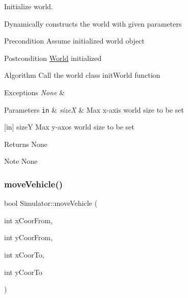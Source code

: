 Initialize world. 

Dynamically constructs the world with given parameters

\begin{DoxyPrecond}{Precondition}
Assume initialized world object
\end{DoxyPrecond}
\begin{DoxyPostcond}{Postcondition}
\hyperlink{class_world}{World} initialized
\end{DoxyPostcond}
\begin{DoxyParagraph}{Algorithm}
Call the world class init\+World function
\end{DoxyParagraph}

\begin{DoxyExceptions}{Exceptions}
{\em None} & \\
\hline
\end{DoxyExceptions}

\begin{DoxyParams}[1]{Parameters}
\mbox{\tt in}  & {\em sizeX} & Max x-\/axis world size to be set\\
\hline
\end{DoxyParams}
\mbox{[}in\mbox{]} sizeY Max y-\/axos world size to be set

\begin{DoxyReturn}{Returns}
None
\end{DoxyReturn}
\begin{DoxyNote}{Note}
None 
\end{DoxyNote}
\hypertarget{class_simulator_afbce79bf2c4d38959da81693df3d3d29}{}\label{class_simulator_afbce79bf2c4d38959da81693df3d3d29} 
\subsubsection{\texorpdfstring{move\+Vehicle()}{moveVehicle()}}
{\footnotesize\ttfamily bool Simulator\+::move\+Vehicle (\begin{DoxyParamCaption}\item[{int}]{x\+Coor\+From,  }\item[{int}]{y\+Coor\+From,  }\item[{int}]{x\+Coor\+To,  }\item[{int}]{y\+Coor\+To }\end{DoxyParamCaption})}

\hypertarget{class_simulator_aa2de7e32b04cc3e8fc60aec23997621b}{}\label{class_simulator_aa2de7e32b04cc3e8fc60aec23997621b} 
